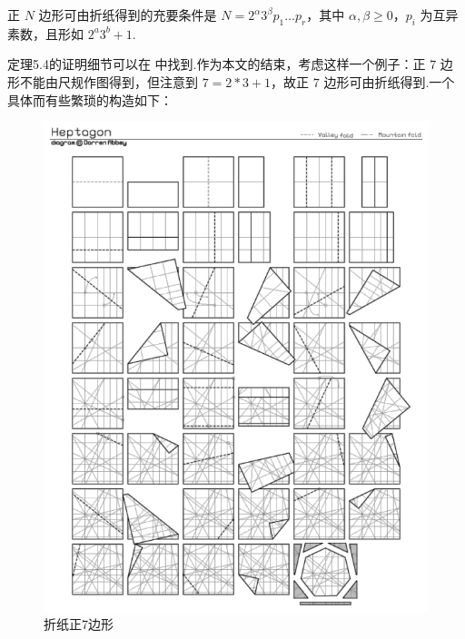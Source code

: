 \begin{theorem}
    正 $N$ 边形可由折纸得到的充要条件是 $N=2^\alpha 3^\beta p_1\dots p_r$，其中 $\alpha,\beta\geq 0$，$p_i$ 为互异素数，且形如 $2^a3^b+1$.
\end{theorem}

定理5.4的证明细节可以在 \cite{Vid}中找到.作为本文的结束，考虑这样一个例子：正 $7$ 边形不能由尺规作图得到，但注意到 $7=2*3+1$，故正 $7$ 边形可由折纸得到.一个具体而有些繁琐的构造如下：

\begin{figure}[h]
    \centering
    \includegraphics[scale=0.5]{7-gons.png}
    \caption{折纸正7边形}
\end{figure}
